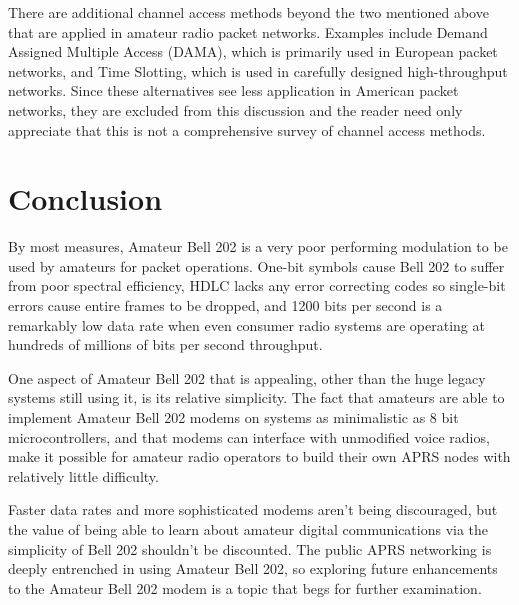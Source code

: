 There are additional channel access methods beyond the two mentioned above
that are applied in amateur radio packet networks. 
Examples include Demand Assigned Multiple Access (DAMA),
which is primarily used in European packet networks,
and Time Slotting, which is used in carefully designed high-throughput networks.
Since these alternatives see less application in American packet networks,
they are excluded from this discussion and the reader need only appreciate that
this is not a comprehensive survey of channel access methods.

\section{Conclusion}


By most measures, Amateur Bell 202 is a very poor performing modulation to
be used by amateurs for packet operations. 
One-bit symbols cause Bell 202 to suffer from poor spectral efficiency,
HDLC lacks any error correcting codes so single-bit errors cause entire 
frames to be dropped, and 1200 bits per second is a remarkably low
data rate when even consumer radio systems are operating at hundreds of millions
of bits per second throughput.

One aspect of Amateur Bell 202 that is appealing, other than the 
huge legacy systems still using it, is its relative simplicity.
The fact that amateurs are able to implement Amateur Bell 202 modems on
systems as minimalistic as 8 bit microcontrollers, and that modems can 
interface with unmodified voice radios,
make it possible for amateur radio operators to build their
own APRS nodes with relatively little difficulty.

Faster data rates and more sophisticated modems aren't being discouraged,
but the value of being able to learn about amateur digital communications 
via the simplicity of Bell 202 shouldn't be discounted.
The public APRS networking is deeply entrenched in using Amateur Bell 202,
so exploring future enhancements to the Amateur Bell 202 modem is a
topic that begs for further examination.

